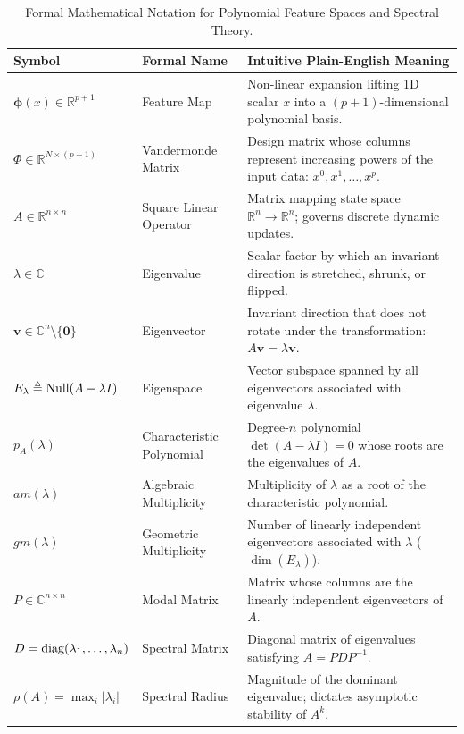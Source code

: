 \begin{table}[htbp]
\centering
\small
\begin{tabularx}{\textwidth}{llX}
\toprule
\textbf{Symbol} & \textbf{Formal Name} & \textbf{Intuitive Plain-English Meaning} \\
\midrule
$\boldsymbol{\phi}(x) \in \mathbb{R}^{p+1}$ & Feature Map & Non-linear expansion lifting 1D scalar $x$ into a $(p+1)$-dimensional polynomial basis. \\
$\Phi \in \mathbb{R}^{N \times (p+1)}$ & Vandermonde Matrix & Design matrix whose columns represent increasing powers of the input data: $x^0, x^1, \dots, x^p$. \\
$A \in \mathbb{R}^{n \times n}$ & Square Linear Operator & Matrix mapping state space $\mathbb{R}^n \to \mathbb{R}^n$; governs discrete dynamic updates. \\
$\lambda \in \mathbb{C}$ & Eigenvalue & Scalar factor by which an invariant direction is stretched, shrunk, or flipped. \\
$\mathbf{v} \in \mathbb{C}^n \setminus \{\mathbf{0}\}$ & Eigenvector & Invariant direction that does not rotate under the transformation: $A\mathbf{v} = \lambda \mathbf{v}$. \\
$E_\lambda \triangleq \operatorname{Null}(A - \lambda I)$ & Eigenspace & Vector subspace spanned by all eigenvectors associated with eigenvalue $\lambda$. \\
$p_A(\lambda)$ & Characteristic Polynomial & Degree-$n$ polynomial $\det(A - \lambda I) = 0$ whose roots are the eigenvalues of $A$. \\
$am(\lambda)$ & Algebraic Multiplicity & Multiplicity of $\lambda$ as a root of the characteristic polynomial. \\
$gm(\lambda)$ & Geometric Multiplicity & Number of linearly independent eigenvectors associated with $\lambda$ ($\dim(E_\lambda)$). \\
$P \in \mathbb{C}^{n \times n}$ & Modal Matrix & Matrix whose columns are the linearly independent eigenvectors of $A$. \\
$D = \operatorname{diag}(\lambda_1, \dots, \lambda_n)$ & Spectral Matrix & Diagonal matrix of eigenvalues satisfying $A = PDP^{-1}$. \\
$\rho(A) = \max_i |\lambda_i|$ & Spectral Radius & Magnitude of the dominant eigenvalue; dictates asymptotic stability of $A^k$. \\
\bottomrule
\end{tabularx}
\caption{Formal Mathematical Notation for Polynomial Feature Spaces and Spectral Theory.}
\label{tab:w04_notation}
\end{table}

